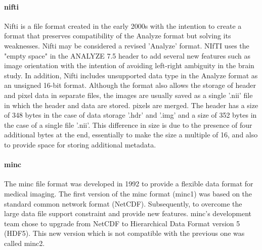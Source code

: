 \paragraph{\acs{nifti}}
Nifti is a file format created in the early 2000s with the intention to create a format that preserves compatibility of the Analyze format but solving its weaknesses. Nifti may be considered a revised 'Analyze' format. NIfTI uses the "empty space" in the ANALYZE 7.5 header to add several new features such as image orientation with the intention of avoiding left-right ambiguity in the brain study. In addition, Nifti includes unsupported data type in the Analyze format as an unsigned 16-bit format. Although the format also allows the storage of header and pixel data in separate files, the images are usually saved as a single '.nii' file in which the header and data are stored. pixels are merged. The header has a size of 348 bytes in the case of data storage '.hdr' and '.img' and a size of 352 bytes in the case of a single file '.nii'. This difference in size is due to the presence of four additional bytes at the end, essentially to make the size a multiple of 16, and also to provide space for storing additional metadata.\cite{NIF:1,ME:1}
\paragraph{\acs{minc}}
The \acs{minc} file format was developed in 1992 to provide a flexible data format for medical imaging. The first version of the \acs{minc} format (\acs{minc}1) was based on the standard common network format (NetCDF). Subsequently, to overcome the large data file support constraint and provide new features. \acs{minc}'s development team chose to upgrade from NetCDF to Hierarchical Data Format version 5 (HDF5). This new version which is not compatible with the previous one was called \acs{minc}2.\cite{MIN:1,ME:1}
